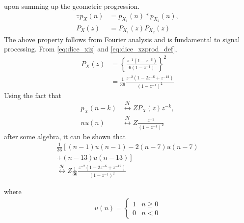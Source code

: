 \documentclass[12pt]{book}
\providecommand{\lsbrak}[1]{\ensuremath{{}\left[#1\right.}}
\providecommand{\rsbrak}[1]{\ensuremath{{}\left.#1\right]}}
\providecommand{\brak}[1]{\ensuremath{\left(#1\right)}}
\providecommand{\cbrak}[1]{\ensuremath{\left\{#1\right\}}}
\providecommand{\system}{\overset{\mathcal{H}}{ \longleftrightarrow}}
\begin{document}
\begin{enumerate}
upon summing up the geometric progression.  
\begin{align}
\because p_X(n) &= p_{X_1}(n)*p_{X_2}(n),
\\
P_X(z) &= P_{X_1}(z)P_{X_2}(z)
\label{eq:dice_xzprod_def}
\end{align}
The above property follows from Fourier analysis and is fundamental to signal processing.  
From \eqref{eq:dice_xiz} and \eqref{eq:dice_xzprod_def},
\begin{align}
P_X(z) &= \cbrak{\frac{z^{-1}\brak{1-z^{-6}}}{6\brak{1-z^{-1}}}}^2
\\
&= \frac{1}{36}\frac{z^{-2}\brak{1-2z^{-6}+z^{-12}}}{\brak{1-z^{-1}}^2}
\label{eq:dice_xzprod}
\end{align}
Using the fact that 
\begin{align}
p_X(n-k) &\system{Z}P_X(z)z^{-k},
\\
nu(n)&\system{Z} \frac{z^{-1}}{\brak{1-z^{-1}}^2}
\end{align}
after some algebra, it can be shown that
\begin{multline}
\frac{1}{36}\lsbrak{\brak{n-1}u(n-1) - 2 \brak{n-7}u(n-7)}
\\
\rsbrak{ +\brak{n-13}u(n-13)}
\\
\system{Z}
\frac{1}{36}\frac{z^{-2}\brak{1-2z^{-6}+z^{-12}}}{\brak{1-z^{-1}}^2}
\label{eq:dice_xz_closed}
\end{multline}

where 
\begin{align}
u(n) =
\begin{cases}
1 & n \ge 0
\\
0 & n < 0
\end{cases}
\end{align}


\end{enumerate}
\end{document}
